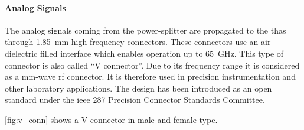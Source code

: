 \paragraph{Analog Signals}
The analog signals coming from the power-splitter are propagated to the \glspl{tha} through \SI{1.85}{\mm} high-frequency connectors. 
These connectors use an air dielectric filled interface which enables operation up to \SI{65}{\GHz}. 
This type of connector is also called ``V connector''. 
Due to its frequency range it is considered as a mm-wave \gls{rf} connector.
It is therefore used in precision instrumentation and other laboratory applications.
The design has been introduced as an open standard under the \gls{ieee} 287 Precision Connector Standards Committee. \cite{v_conn}

\autoref{fig:v_conn} shows a V connector in male and female type.
